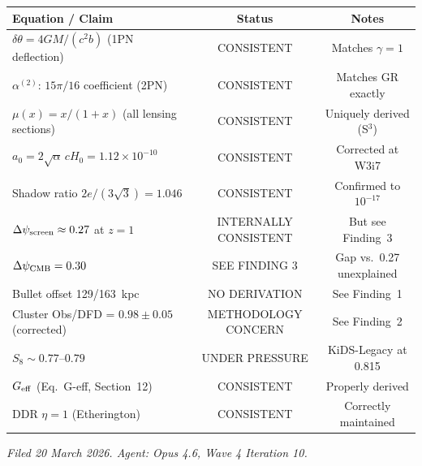 \begin{tabular}{lcc}
\toprule
Equation / Claim & Status & Notes \\
\midrule
$\delta\theta = 4GM/(c^2 b)$ (1PN deflection) & CONSISTENT & Matches $\gamma = 1$ \\
$\alpha^{(2)}$: $15\pi/16$ coefficient (2PN) & CONSISTENT & Matches GR exactly \\
$\mu(x) = x/(1+x)$ (all lensing sections) & CONSISTENT & Uniquely derived (S$^3$) \\
$a_0 = 2\sqrt{\alpha}\,cH_0 = 1.12 \times 10^{-10}$ & CONSISTENT & Corrected at W3i7 \\
Shadow ratio $2e/(3\sqrt{3}) = 1.046$ & CONSISTENT & Confirmed to $10^{-17}$ \\
$\Delta\psi_{\rm screen} \approx 0.27$ at $z=1$ & INTERNALLY CONSISTENT & But see Finding~3 \\
$\Delta\psi_{\rm CMB} = 0.30$ & SEE FINDING 3 & Gap vs.\ 0.27 unexplained \\
Bullet offset 129/163~kpc & NO DERIVATION & See Finding~1 \\
Cluster Obs/DFD = $0.98 \pm 0.05$ (corrected) & METHODOLOGY CONCERN & See Finding~2 \\
$S_8 \sim 0.77$--$0.79$ & UNDER PRESSURE & KiDS-Legacy at 0.815 \\
$G_{\rm eff}$ (Eq.~G-eff, Section~12) & CONSISTENT & Properly derived \\
DDR $\eta = 1$ (Etherington) & CONSISTENT & Correctly maintained \\
\bottomrule
\end{tabular}

\vspace{1em}
\noindent\textit{Filed 20 March 2026.  Agent: Opus 4.6, Wave 4 Iteration 10.}


